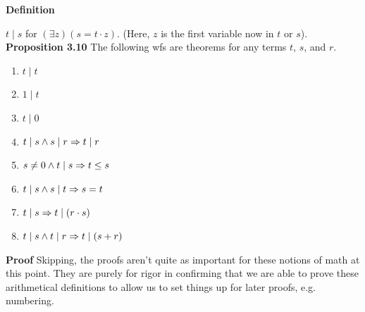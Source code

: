 \textbf{Definition}

$t \mid s $ for $(\exists z)(s = t \cdot z)$. (Here, $z$ is the first variable now in $t$ or $s$).\\

\textbf{Proposition 3.10}
The following wfs are theorems for any terms $t$, $s$, and $r$.

\begin{enumerate} [label = \alph*.]
    \item $t \mid t$
    \item $1 \mid t$
    \item $t \mid 0$
    \item $t \mid s \land s \mid r \Rightarrow t \mid r$
    \item $s \not = 0 \land t \mid s \Rightarrow t \leq s$
    \item $t \mid s \land s \mid t \Rightarrow s = t$
    \item $t \mid s \Rightarrow t \mid (r \cdot s)$
    \item $t \mid s \land t \mid r \Rightarrow t \mid(s+r)$
\end{enumerate}

\textbf{Proof}
Skipping, the proofs aren't quite as important for these notions of math at this point. They are purely for rigor in confirming that we are able to prove these arithmetical definitions to allow us to set things up for later proofs, e.g. \godel $\ $numbering.

